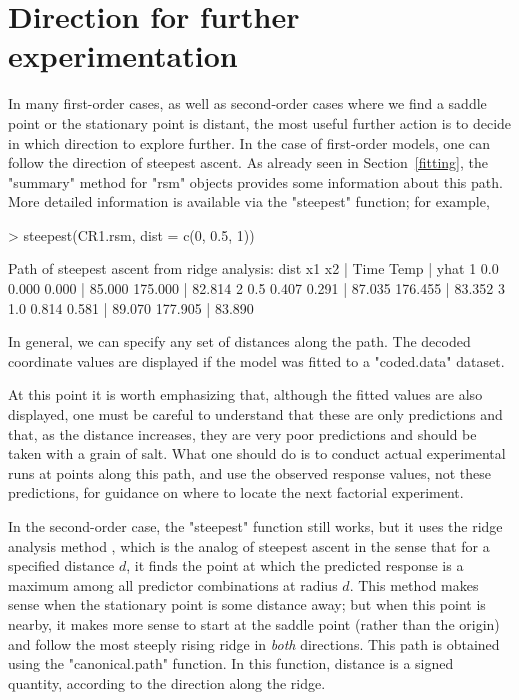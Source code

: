\documentclass[article,nojss]{jss}
\def\Sect#1{Section~\ref{#1}}
\begin{document}
\section{Direction for further experimentation}\label{steepest}
In many first-order cases, as well as second-order cases where we find a saddle point or the stationary point is distant, the most useful further action is to decide in which direction to explore further.  In the case of first-order models, one can follow the direction of steepest ascent.  As already seen in \Sect{fitting}, the "summary" method for "rsm" objects provides some information about this path.  More detailed information is available via the "steepest" function; for example,
\begin{Schunk}
\begin{Sinput}
> steepest(CR1.rsm, dist = c(0, 0.5, 1))
\end{Sinput}
\begin{Soutput}
Path of steepest ascent from ridge analysis:
  dist    x1    x2 |   Time    Temp |   yhat
1  0.0 0.000 0.000 | 85.000 175.000 | 82.814
2  0.5 0.407 0.291 | 87.035 176.455 | 83.352
3  1.0 0.814 0.581 | 89.070 177.905 | 83.890
\end{Soutput}
\end{Schunk}
In general, we can specify any set of distances along the path.  The  decoded coordinate values are displayed if the model was fitted to a "coded.data" dataset.  

At this point it is worth emphasizing that, although the fitted values are also displayed, one must be careful to understand that these are only predictions and that, as the distance increases, they are very poor predictions and should be taken with a grain of salt.  What one should do is to conduct actual experimental runs at points along this path, and use the observed response values, not these predictions, for guidance on where to locate the next factorial experiment.

In the second-order case, the "steepest" function still works, but it uses the ridge analysis method \cite[]{Hoe59,Dra63}, which is the analog of steepest ascent in the sense that for a specified distance $d$, it finds the point at which the predicted response is a maximum among all predictor combinations at radius $d$.  This method makes sense when the stationary point is some distance away; but when this point is nearby, it makes more sense to start at the saddle point (rather than the origin) and follow the most steeply rising ridge in \emph{both} directions.  This path is obtained using the "canonical.path" function.  In this function, distance is a signed quantity, according to the direction along the ridge.
\end{document}
